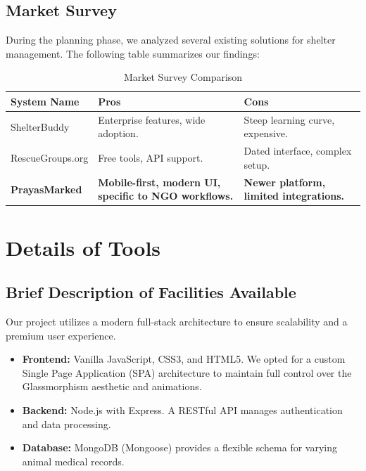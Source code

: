 \documentclass[12pt,a4paper]{report}
\begin{document}
\section{Market Survey}
During the planning phase, we analyzed several existing solutions for shelter management. The following table summarizes our findings:
\begin{table}[H]
    \centering
    \caption{Market Survey Comparison}
    \begin{tabularx}{\textwidth}{|l|X|l|}
        \hline
        \textbf{System Name} & \textbf{Pros} & \textbf{Cons} \\
        \hline
        ShelterBuddy & Enterprise features, wide adoption. & Steep learning curve, expensive. \\
        RescueGroups.org & Free tools, API support. & Dated interface, complex setup. \\
        \textbf{PrayasMarked} & \textbf{Mobile-first, modern UI, specific to NGO workflows.} & \textbf{Newer platform, limited integrations.} \\
        \hline
    \end{tabularx}
\end{table}

\chapter{Details of Tools}
\section{Brief Description of Facilities Available}
Our project utilizes a modern full-stack architecture to ensure scalability and a premium user experience.
\begin{itemize}
    \item \textbf{Frontend:} Vanilla JavaScript, CSS3, and HTML5. We opted for a custom Single Page Application (SPA) architecture to maintain full control over the Glassmorphism aesthetic and animations.
    \item \textbf{Backend:} Node.js with Express. A RESTful API manages authentication and data processing.
    \item \textbf{Database:} MongoDB (Mongoose) provides a flexible schema for varying animal medical records.
\end{itemize}
\end{document}
